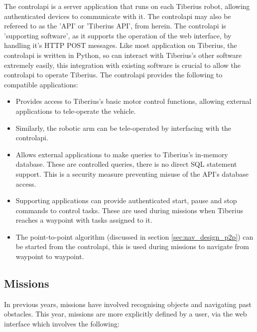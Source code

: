The \gls{controlapi} is a server application that runs on each Tiberius robot, allowing authenticated devices to communicate with it. The \gls{controlapi} may also be refereed to as the 'API' or 'Tiberius API', from herein. The \gls{controlapi} is 'supporting software', as it supports the operation of the web interface, by handling it's \gls{HTTP} \gls{POST} messages. Like most application on Tiberius, the \gls{controlapi} is written in Python, so can interact with Tiberius's other software extremely easily, this integration with existing software is crucial to allow the \gls{controlapi} to operate Tiberius. The \gls{controlapi} provides the following to compatible applications:

\begin{itemize}
\item Provides access to Tiberius's basic motor control functions, allowing external applications to tele-operate the vehicle.

\item Similarly, the robotic arm can be tele-operated by interfacing with the \gls{controlapi}.

\item Allows external applications to make queries to Tiberius's in-memory database. These are controlled queries, there is no direct SQL statement support. This is a security measure preventing misuse of the API's database access.

\item Supporting applications can provide authenticated start, pause and stop commands to control tasks. These are used during missions when Tiberius reaches a waypoint with tasks assigned to it.

\item The point-to-point algorithm (discussed in section \ref{sec:nav_design_p2p}) can be started from the \gls{controlapi}, this is used during missions to navigate from waypoint to waypoint.

\end{itemize}

\subsection{Missions}
\label{web-missions} %
In previous years, missions have involved recognising objects and navigating past obstacles. This year, missions are more explicitly defined by a user, via the web interface which involves the following:

